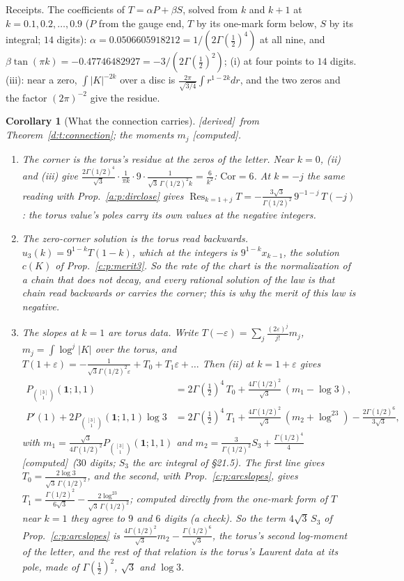 \documentclass[11pt]{article}
\newcommand{\one}{\mathbf 1}
\newcommand{\Pth}{P_{\binom{[3]}1}(\one;1,1)}
\theoremstyle{plain}
\newtheorem{corollary}[proposition]{Corollary}
\theoremstyle{definition}
\theoremstyle{remark}
\newcommand{\derived}{\textup{[derived]}}
\newcommand{\computed}{\textup{[computed]}}
\begin{document}
\noindent Receipts. The coefficients of $T=\alpha P+\beta S$, solved from $k$ and $k+1$ at $k=0.1,0.2,\dots,0.9$ ($P$ from the gauge end, $T$ by its one-mark form below, $S$ by its integral; $14$ digits): $\alpha=0.0506605918212=1/(2\Gamma(\frac12)^4)$ at all nine, and $\beta\tan(\pi k)=-0.47746482927=-3/(2\Gamma(\frac12)^2)$; (i) at four points to $14$ digits. (iii): near a zero, $\int|K|^{-2k}$ over a disc is $\frac{2\pi}{\sqrt{3/4}}\int r^{1-2k}dr$, and the two zeros and the factor $(2\pi)^{-2}$ give the residue.

\begin{corollary}[What the connection carries]\label{d:c:three}\derived\ from Theorem~\ref{d:t:connection}; the moments $m_j$ \computed.\
\begin{enumerate}[label=(\roman*)]
\item \emph{The corner is the torus's residue at the zeros of the letter.} Near $k=0$, (ii) and (iii) give $\frac{2\Gamma(1/2)^4}{\sqrt3}\cdot\frac1{\pi k}\cdot9\cdot\frac1{\sqrt3\,\Gamma(1/2)^2k}=\frac6{k^2}$: $\mathrm{Cor}=6$. At $k=-j$ the same reading with Prop.~\ref{a:p:dirclose} gives $\operatorname{Res}_{k=1+j}T=-\frac{3\sqrt3}{\Gamma(1/2)^2}\,9^{-1-j}\,T(-j)$: the torus value's poles carry its own values at the negative integers.
\item \emph{The zero-corner solution is the torus read backwards.} $u_3(k)=9^{1-k}T(1-k)$, which at the integers is $9^{1-k}x_{k-1}$, the solution $c(K)$ of Prop.~\ref{c:p:merit3}. So the rate of the chart is the normalization of a chain that does not decay, and every rational solution of the law is that chain read backwards or carries the corner; this is why the merit of this law is negative.
\item \emph{The slopes at $k=1$ are torus data.} Write $T(-\varepsilon)=\sum_j\frac{(2\varepsilon)^j}{j!}m_j$, $m_j=\int\log^j|K|$ over the torus, and $T(1+\varepsilon)=-\frac{1}{\sqrt3\Gamma(1/2)^2\varepsilon}+T_0+T_1\varepsilon+\dots$ Then (ii) at $k=1+\varepsilon$ gives
\begin{align*}
\Pth&=2\Gamma(\tfrac12)^4\,T_0+\tfrac{4\Gamma(1/2)^2}{\sqrt3}\,(m_1-\log3),\\
P'(1)+2\Pth\log3&=2\Gamma(\tfrac12)^4\,T_1+\tfrac{4\Gamma(1/2)^2}{\sqrt3}\,(m_2+\log^23)-\tfrac{2\Gamma(1/2)^6}{3\sqrt3},
\end{align*}
with $m_1=\frac{\sqrt3}{4\Gamma(1/2)^2}\Pth$ and $m_2=\frac3{\Gamma(1/2)^2}S_3+\frac{\Gamma(1/2)^4}4$ \computed\ ($30$ digits; $S_3$ the arc integral of \S21.5). The first line gives $T_0=\frac{2\log3}{\sqrt3\,\Gamma(1/2)^2}$, and the second, with Prop.~\ref{c:p:arcslopes}, gives $T_1=\frac{\Gamma(1/2)^2}{6\sqrt3}-\frac{2\log^23}{\sqrt3\,\Gamma(1/2)^2}$; computed directly from the one-mark form of $T$ near $k=1$ they agree to $9$ and $6$ digits (a check). So the term $4\sqrt3\,S_3$ of Prop.~\ref{c:p:arcslopes} is $\frac{4\Gamma(1/2)^2}{\sqrt3}m_2-\frac{\Gamma(1/2)^6}{\sqrt3}$, the torus's second log-moment of the letter, and the rest of that relation is the torus's Laurent data at its pole, made of $\Gamma(\frac12)^2$, $\sqrt3$ and $\log3$.

\end{enumerate}
\end{corollary}
\end{document}
